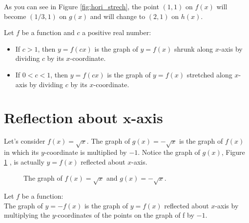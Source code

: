As you can see in Figure \ref{fig:hori_strech}, the point $(1,1)$ on $f(x)$ will become $(1/3,1)$ on $g(x)$ and will change to $(2,1)$ on $h(x)$.
\begin{tcolorbox}[title=Horizontal stretching or shrinking,fonttitle=\bfseries,
colframe=blue!75!black,colback=blue!10!white]
Let $f$ be a function and $c$ a positive real number:
\begin{itemize}[noitemsep]
    \item If $c>1$, then $y=f(cx)$ is the graph of $y=f(x)$ shrunk along $x$-axis by dividing $c$ by its $x$-coordinate.
    \item If $0<c<1$, then $y=f(cx)$ is the graph of $y=f(x)$ stretched along $x$-axis by dividing $c$ by its $x$-coordinate.
\end{itemize}
\end{tcolorbox}
\section{Reflection about \texorpdfstring{$\bm{x}$}{TEXT}-axis}
Let's consider $f(x) = \sqrt{x}$. The graph of $g(x) = -\sqrt{x}$ is the graph of $f(x)$ in which its $y$-coordinate is multiplied by $-1$. Notice the graph of $g(x)$, Figure \ref{fig:reflect_x} , is actually $y=f(x)$ reflected about $x$-axis.
\begin{figure}[ht]
\begin{center}
\end{center}
\caption{The graph of $f(x)=\sqrt{x}$ and $g(x)=-\sqrt{x}$.}
\label{fig:reflect_x}
\end{figure}
\begin{tcolorbox}[title=Reflection about $\bm{x}$-axis,fonttitle=\bfseries,
colframe=blue!75!black,colback=blue!10!white]
%
Let $f$ be a function:\\
The graph of $y=-f(x)$ is the graph of $y=f(x)$ reflected about $x$-axis by multiplying the $y$-coordinates of the points on the graph of f by $−1$.
%
\end{tcolorbox}
